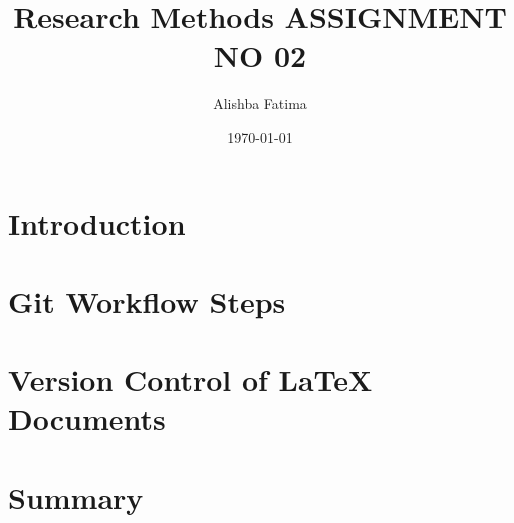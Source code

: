 \documentclass{article}
\title{Research Methods ASSIGNMENT NO 02 }
\author{Alishba Fatima}
\date{\today}
\begin{document}
\maketitle

\section{Introduction}


\section{Git Workflow Steps}

\section{Version Control of LaTeX Documents}

\section{Summary}
\end{document}
